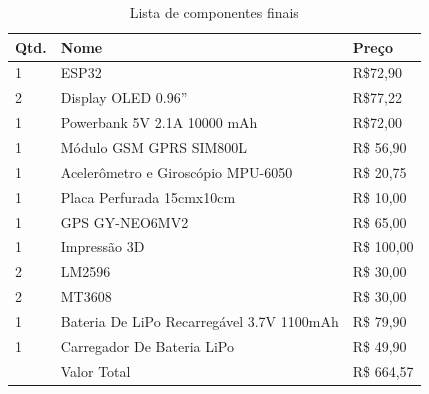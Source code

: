 \begin{table}[]
\centering
\label{tab:componentes2} 
\begin{tabular}{|l|l|l|}
\hline
Qtd. & Nome                               & Preço     \\ \hline
1    & ESP32                              & R\$72,90  \\ \hline
2    & Display OLED 0.96”                 & R\$77,22  \\ \hline
1    & Powerbank 5V 2.1A 10000 mAh        & R\$72,00  \\ \hline
1    & Módulo GSM GPRS SIM800L            & R\$ 56,90 \\ \hline
1    & Acelerômetro e Giroscópio MPU-6050 & R\$ 20,75 \\ \hline
1    & Placa Perfurada 15cmx10cm          & R\$ 10,00 \\ \hline
1    & GPS GY-NEO6MV2                        & R\$ 65,00 \\ \hline
1    & Impressão 3D                       & R\$ 100,00 \\ \hline
2    & LM2596                             & R\$ 30,00  \\ \hline
2    & MT3608                             & R\$ 30,00 \\ \hline
1    & Bateria De LiPo Recarregável 3.7V 1100mAh & R\$ 79,90 \\ \hline
1    & Carregador De Bateria LiPo         & R\$ 49,90 \\ \hline
     & Valor Total                        & R\$ 664,57 \\ \hline
\end{tabular}
\caption{Lista de componentes finais}
\end{table}